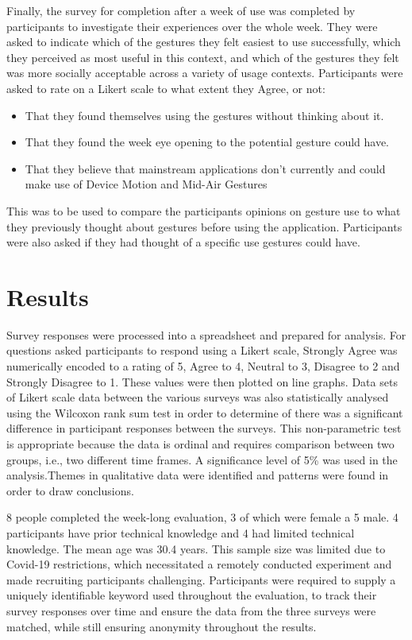 \documentclass{l4proj}
\begin{document}
Finally, the survey for completion after a week of use was completed by participants to investigate their experiences over the whole week. They were asked to indicate which of the gestures they felt easiest to use successfully, which they perceived as most useful in this context, and which of the gestures they felt was more socially acceptable across a variety of usage contexts. Participants were asked to rate on a Likert scale to what extent they Agree, or not: 
\begin{itemize}
  \item That they found themselves using the gestures without thinking about it.
  \item That they  found the week eye opening to the potential gesture could have.
  \item That they believe that mainstream applications don't currently and could make use of Device Motion and Mid-Air Gestures
\end{itemize}
This was to be used to compare the participants opinions on gesture use to what they previously thought about gestures before using the application. Participants were also asked if they had thought of a specific use gestures could have.


\section{Results} 

Survey responses were processed into a spreadsheet and prepared for analysis. For questions asked participants to respond using a Likert scale, Strongly Agree was numerically encoded to a rating of 5, Agree to 4, Neutral to 3, Disagree to 2 and Strongly Disagree to 1. These values were then plotted on line graphs. Data sets of Likert scale data between the various surveys was also statistically analysed using the Wilcoxon rank sum test in order to determine of there was a significant difference in participant responses between the surveys. This non-parametric test is appropriate because the data is ordinal and requires comparison between two groups, i.e., two different time frames. A significance level of 5\% was used in the analysis.Themes in qualitative data were identified and patterns were found in order to draw conclusions.

8 people completed the week-long evaluation, 3 of which were female a 5 male. 4 participants have prior technical knowledge and 4 had limited technical knowledge. The mean age was 30.4 years. This sample size was limited due to Covid-19 restrictions, which necessitated a remotely conducted experiment and made recruiting participants challenging. Participants were required to supply a uniquely identifiable keyword used throughout the evaluation, to track their survey responses over time and ensure the data from the three surveys were matched, while still ensuring anonymity throughout the results. 
\end{document}
